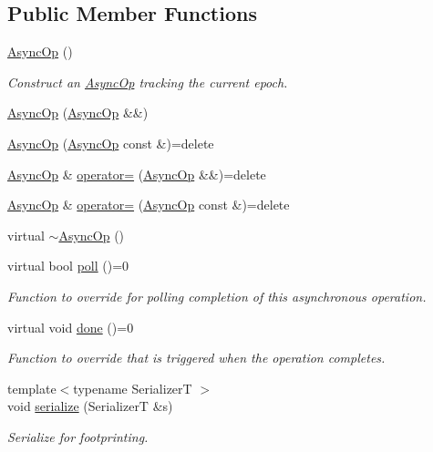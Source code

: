 \subsection*{Public Member Functions}
\begin{DoxyCompactItemize}
\item 
\hyperlink{structvt_1_1messaging_1_1_async_op_a4d2f22c0789b0fecbaced56c3129d1d4}{Async\+Op} ()
\begin{DoxyCompactList}\small\item\em Construct an {\ttfamily \hyperlink{structvt_1_1messaging_1_1_async_op}{Async\+Op}} tracking the current epoch. \end{DoxyCompactList}\item 
\hyperlink{structvt_1_1messaging_1_1_async_op_ad00e71b03c2ed178f06630c9443f7a22}{Async\+Op} (\hyperlink{structvt_1_1messaging_1_1_async_op}{Async\+Op} \&\&)
\item 
\hyperlink{structvt_1_1messaging_1_1_async_op_a9c3101ff1458c4c1aa5ab64fbcbbaa1e}{Async\+Op} (\hyperlink{structvt_1_1messaging_1_1_async_op}{Async\+Op} const \&)=delete
\item 
\hyperlink{structvt_1_1messaging_1_1_async_op}{Async\+Op} \& \hyperlink{structvt_1_1messaging_1_1_async_op_a3c1338faf527f023000897296ba94170}{operator=} (\hyperlink{structvt_1_1messaging_1_1_async_op}{Async\+Op} \&\&)=delete
\item 
\hyperlink{structvt_1_1messaging_1_1_async_op}{Async\+Op} \& \hyperlink{structvt_1_1messaging_1_1_async_op_a96df4cbc045ea2a0ebb40f035fff6bcb}{operator=} (\hyperlink{structvt_1_1messaging_1_1_async_op}{Async\+Op} const \&)=delete
\item 
virtual \hyperlink{structvt_1_1messaging_1_1_async_op_adf861ee523573ddd8434b78496a78271}{$\sim$\+Async\+Op} ()
\item 
virtual bool \hyperlink{structvt_1_1messaging_1_1_async_op_a87259770152a18e1ff8127020c6b0e41}{poll} ()=0
\begin{DoxyCompactList}\small\item\em Function to override for polling completion of this asynchronous operation. \end{DoxyCompactList}\item 
virtual void \hyperlink{structvt_1_1messaging_1_1_async_op_aadffda7e94c47714e4da172927783583}{done} ()=0
\begin{DoxyCompactList}\small\item\em Function to override that is triggered when the operation completes. \end{DoxyCompactList}\item 
{\footnotesize template$<$typename SerializerT $>$ }\\void \hyperlink{structvt_1_1messaging_1_1_async_op_a7e6ed5a7acd0ca5dfad62ec366a2983c}{serialize} (SerializerT \&s)
\begin{DoxyCompactList}\small\item\em Serialize for footprinting. \end{DoxyCompactList}\end{DoxyCompactItemize}
